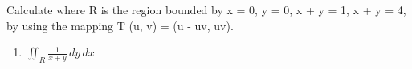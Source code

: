 Calculate where R is the region bounded by x = 0, y = 0, x + y = 1, x + y = 4, by using the mapping T (u, v) = (u - uv, uv).
\begin{enumerate}[label=(\alph*), itemsep=0.4em, topsep=0.5em]
	\item $\displaystyle \iint_R \frac{1}{x + y} \, dy \, dx$
\end{enumerate}
